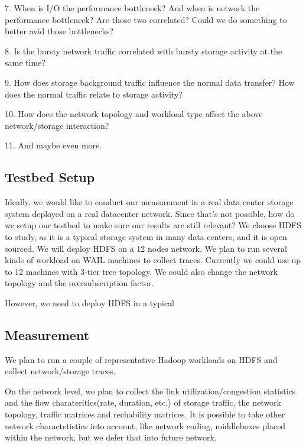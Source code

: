7. When is I/O the performance bottleneck? And when is network the performance bottleneck? Are those two correlated? Could we do something to better avid those bottlenecks?

8. Is the bursty network traffic correlated with bursty storage activity at the same time? 

9. How does storage background traffic influence the normal data transfer? How does the normal traffic relate to storage activity?

10. How does the network topology and workload type affect the above network/storage interaction?

11. And maybe even more.





\subsection {\bf Testbed Setup}
Ideally, we would like to conduct our measurement in a real data center storage system deployed on a real datacenter network. Since that’s not possible, how do we setup our testbed to make sure our results are still relevant? 
We choose HDFS to study, as it is a typical storage system in many data centers, and it is open sourced. We will deploy HDFS on a 12 nodes network. We plan to run several kinds of workload on WAIL machines to collect traces. Currently we could use up to 12 machines with 3-tier tree topology. We could also change the network topology and the oversubscription factor. 

However, we need to deploy HDFS in a typical 

\subsection {\bf Measurement}
We plan to run a couple of representative Hadoop workloads on HDFS and collect network/storage traces.

On the network level, we plan to collect the link utilization/congestion statistics and the flow charateritics(rate, duration, etc.) of storage traffic, the network topology, traffic matrices and rechability matrices. It is possible to take other network charactetistics into account, like network coding, middleboxes placed within the network, but we defer that into future network. 


